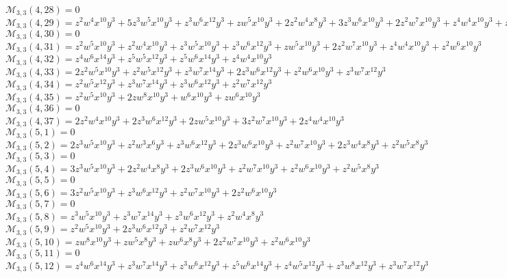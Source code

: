 \documentclass[12pt]{memoireuqam1.3}
\begin{document}
$\mathcal{M}_{3,3}(4,28)=0$\\
$\mathcal{M}_{3,3}(4,29)=z^2w^4x^{10}y^3+5z^3w^5x^{10}y^3+z^3w^6x^{12}y^3+zw^5x^{10}y^3+2z^2w^4x^8y^3+3z^3w^6x^{10}y^3+2z^2w^7x^{10}y^3+z^4w^4x^{10}y^3+z^2w^5x^8y^3$\\
$\mathcal{M}_{3,3}(4,30)=0$\\
$\mathcal{M}_{3,3}(4,31)=z^2w^5x^{10}y^3+z^2w^4x^{10}y^3+z^3w^5x^{10}y^3+z^3w^6x^{12}y^3+zw^5x^{10}y^3+2z^2w^7x^{10}y^3+z^4w^4x^{10}y^3+z^2w^6x^{10}y^3$\\
$\mathcal{M}_{3,3}(4,32)=z^4w^6x^{14}y^3+z^5w^5x^{12}y^3+z^5w^6x^{14}y^3+z^4w^4x^{10}y^3$\\
$\mathcal{M}_{3,3}(4,33)=2z^2w^5x^{10}y^3+z^2w^5x^{12}y^3+z^3w^7x^{14}y^3+2z^3w^6x^{12}y^3+z^2w^6x^{10}y^3+z^3w^7x^{12}y^3$\\
$\mathcal{M}_{3,3}(4,34)=z^2w^5x^{12}y^3+z^3w^7x^{14}y^3+z^3w^6x^{12}y^3+z^2w^7x^{12}y^3$\\
$\mathcal{M}_{3,3}(4,35)=z^2w^5x^{10}y^3+2zw^8x^{10}y^3+w^6x^{10}y^3+zw^6x^{10}y^3$\\
$\mathcal{M}_{3,3}(4,36)=0$\\
$\mathcal{M}_{3,3}(4,37)=2z^2w^4x^{10}y^3+2z^3w^6x^{12}y^3+2zw^5x^{10}y^3+3z^2w^7x^{10}y^3+2z^4w^4x^{10}y^3$\\
$\mathcal{M}_{3,3}(5,1)=0$\\
$\mathcal{M}_{3,3}(5,2)=2z^3w^5x^{10}y^3+z^2w^3x^6y^3+z^3w^6x^{12}y^3+2z^3w^6x^{10}y^3+z^2w^7x^{10}y^3+2z^3w^4x^8y^3+z^2w^5x^8y^3$\\
$\mathcal{M}_{3,3}(5,3)=0$\\
$\mathcal{M}_{3,3}(5,4)=3z^3w^5x^{10}y^3+2z^2w^4x^8y^3+2z^3w^6x^{10}y^3+z^2w^7x^{10}y^3+z^2w^6x^{10}y^3+z^2w^5x^8y^3$\\
$\mathcal{M}_{3,3}(5,5)=0$\\
$\mathcal{M}_{3,3}(5,6)=3z^2w^5x^{10}y^3+z^3w^6x^{12}y^3+z^2w^7x^{10}y^3+2z^2w^6x^{10}y^3$\\
$\mathcal{M}_{3,3}(5,7)=0$\\
$\mathcal{M}_{3,3}(5,8)=z^3w^5x^{10}y^3+z^3w^7x^{14}y^3+z^3w^6x^{12}y^3+z^2w^4x^8y^3$\\
$\mathcal{M}_{3,3}(5,9)=z^2w^5x^{10}y^3+2z^3w^6x^{12}y^3+z^2w^7x^{12}y^3$\\
$\mathcal{M}_{3,3}(5,10)=zw^8x^{10}y^3+zw^5x^8y^3+zw^6x^8y^3+2z^2w^7x^{10}y^3+z^2w^6x^{10}y^3$\\
$\mathcal{M}_{3,3}(5,11)=0$\\
$\mathcal{M}_{3,3}(5,12)=z^4w^6x^{14}y^3+z^3w^7x^{14}y^3+z^3w^6x^{12}y^3+z^5w^6x^{14}y^3+z^4w^5x^{12}y^3+z^3w^8x^{12}y^3+z^3w^7x^{12}y^3$\\
\end{document}
